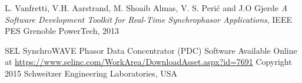 \documentclass[conference]{IEEEtran}
\begin{document}
\begin{thebibliography}{1}


 L. Vanfretti, V.H. Aarstrand, M. Shoaib Almas, V. S. Peri\'c and J.O Gjerde \emph{A Software Development Toolkit for Real-Time Synchrophasor Applications},  IEEE PES Grenoble PowerTech, 2013




 SEL SynchroWAVE Phasor Data Concentrator (PDC) Software Available Online at \url{https://www.selinc.com/WorkArea/DownloadAsset.aspx?id=7691} Copyright 2015 Schweitzer Engineering Laboratories, USA

\end{thebibliography}
%
\end{document}
